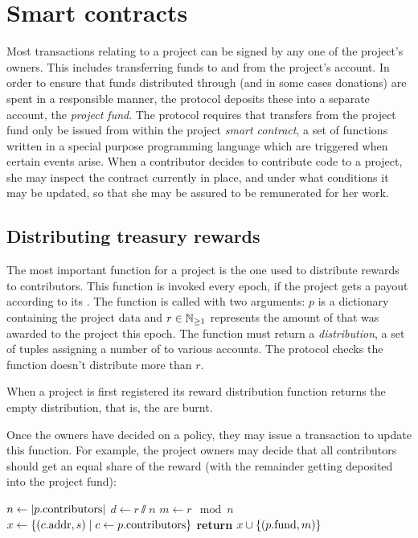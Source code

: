 
\section{Smart contracts}
\label{s:smart-contracts}

Most transactions relating to a project can be signed by any one of the
project's owners. This includes transferring funds to and from the project's
account. In order to ensure that funds distributed through \osrank{} (and
in some cases donations) are spent in a responsible manner, the protocol deposits
these into a separate account, the \emph{project fund}. The protocol requires
that transfers from the project fund only be issued from within the project
\emph{smart contract}, a set of functions written in a special purpose
programming language which are triggered when certain events arise. When a
contributor decides to contribute code to a project, she may inspect the
contract currently in place, and under what conditions it may be updated,
so that she may be assured to be remunerated for her work.

\subsection{Distributing treasury rewards}

The most important function for a project is the one used to distribute rewards
to contributors. This function is invoked every epoch, if the project gets a
payout according to its \osrank{}. The function is called with two arguments:
$p$ is a dictionary containing the project data and $r \in \mathbb{N}_{\geq 1}$ represents
the amount of \oscoin{} that was awarded to the project this epoch. The
function must return a \emph{distribution}, a set of tuples assigning a number
of \oscoin{} to various accounts. The protocol checks the function doesn't
distribute more than $r$.

When a project is first registered its reward distribution function returns the
empty distribution, that is, the \oscoin{} are burnt.

Once the owners have decided on a policy, they may issue a transaction to update
this function. For example, the project owners may decide that all contributors
should get an equal share of the reward (with the remainder getting deposited
into the project fund):
\medskip
\begin{algorithmic}[0]
        \State $n \gets |p.{\mathrm{contributors}}|$
        \State $d \gets r \sslash n$
        \State $m \gets r \mod n$
        \State $x \gets \{ (c.{\mathrm{addr}}, s) \mid c \gets p.{\mathrm{contributors}} \}$
        \State \textbf{return} $x \cup \{ (p.{\mathrm{fund}}, m) \}$
    \EndProcedure
\end{algorithmic}

